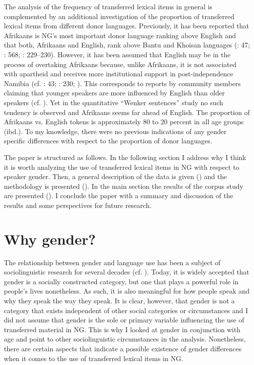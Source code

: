 \documentclass[output=paper]{langsci/langscibook}
\begin{document}
The analysis of the frequency of transferred lexical items in general is complemented by an additional investigation of the proportion of transferred lexical items from different donor languages. Previously, it has been reported that Afrikaans is NG’s most important donor language ranking above English and that both, Afrikaans and English, rank above Bantu and Khoisan languages (\citealt{nockler_sprachmischung_1963}: 47; \citealt{bohm_deutsch_2003}: 568; \citealt{kellermeier-rehbein_sprache_2016}: 229--230). However, it has been assumed that English may be in the process of overtaking Afrikaans because, unlike Afrikaans, it is not associated with apartheid and receives more institutional support in post-independence Namibia (cf. \citealt{shah_german_2007}: 43; \citealt{kellermeier-rehbein_sprache_2016}: 230; \citealt{zimmer_linguisticvar_toappear}). This corresponds to reports by community members claiming that younger speakers are more influenced by English than older speakers (cf. \citealt{zimmer_linguisticvar_toappear}). Yet in the quantitative “Wenker sentences” study no such tendency is observed and Afrikaans seems far ahead of English. The proportion of Afrikaans vs. English tokens is approximately 80 to 20 percent in all age groups (ibd.). To my knowledge, there were no previous indications of any gender specific differences with respect to the proportion of donor languages.

The paper is structured as follows. In the following section I address why I think it is worth analyzing the use of transferred lexical items in NG with respect to speaker gender. Then, a general description of the data is given () and the methodology is presented (). In the main section the results of the corpus study are presented (). I conclude the paper with a summary and discussion of the results and some perspectives for future research.

 
\section{Why gender?}
 \label{sec:bracke:2}
 

The relationship between gender and language use has been a subject of sociolinguistic research for several decades (cf. \citealt{coates_language_2011}). Today, it is widely accepted that gender is a socially constructed category, but one that plays a powerful role in people’s lives nonetheless. As such, it is also meaningful for how people speak and why they speak the way they speak. It is clear, however, that gender is not a category that exists independent of other social categories or circumstances \citep[65]{eckert_gender_2011} and I did not assume that gender is the sole or primary variable influencing the use of transferred material in NG. This is why I looked at gender in conjunction with age and point to other sociolinguistic circumstances in the analysis. Nonetheless, there are certain aspects that indicate a possible existence of gender differences when it comes to the use of transferred lexical items in NG.
\end{document}
